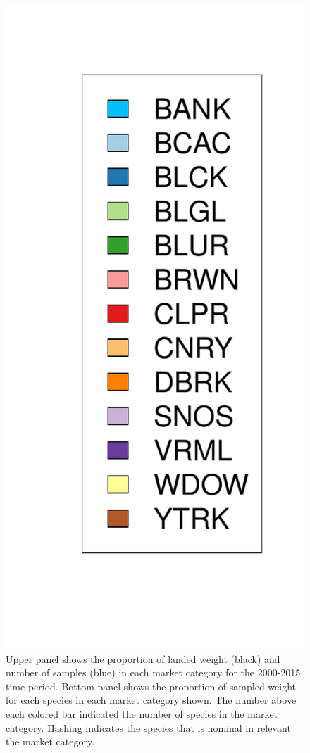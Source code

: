 \documentclass[12pt]{article}
\begin{document}
\begin{landscape}
\begin{figure}[h!]
\includegraphics[height=0.8\textheight]{./pictures/barplotLegend.pdf}
\caption{Upper panel shows the proportion of landed weight (black) and number of                 
samples (blue) in each market category for the 2000-2015 time period. Bottom panel 
shows the proportion of sampled weight for each species in each market category 
shown. The number above each colored bar indicated the number of species in 
the market category. Hashing indicates the species that is nominal in relevant 
the market category.}
\label{bar00}
\end{figure}
\end{landscape}
\end{document}
